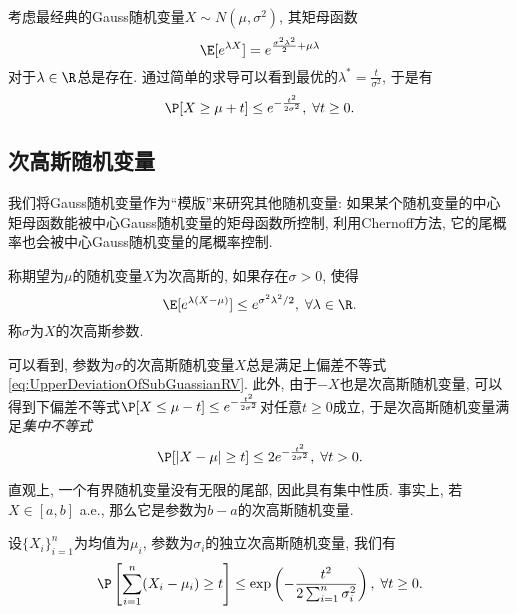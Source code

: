 \begin{example}[Gauss随机变量的上偏差不等式]
	考虑最经典的Gauss随机变量$X \sim N(\mu, \sigma^2)$, 其矩母函数
	\begin{equation}
		\E[e^{\lambda X}] = e^{\frac{\sigma^2 \lambda^2}{2} + \mu \lambda} 		
	\end{equation}
	对于$\lambda \in \R$总是存在. 
	通过简单的求导可以看到最优的$\lambda^* = \frac{t}{\sigma^2}$, 于是有
	\begin{equation}\label{eq:UpperDeviationOfSubGuassianRV}
		\P[X \geq \mu + t] \leq e^{- \frac{t^2}{2 \sigma^2}},\; \forall t \geq 0. 
	\end{equation}
\end{example}

\subsection{次高斯随机变量}

我们将Gauss随机变量作为“模版”来研究其他随机变量: 如果某个随机变量的中心矩母函数能被中心Gauss随机变量的矩母函数所控制, 利用Chernoff方法, 它的尾概率也会被中心Gauss随机变量的尾概率控制. 

\begin{definition}[次高斯随机变量]
	称期望为$\mu$的随机变量$X$为次高斯的, 如果存在$\sigma > 0$, 使得
	\begin{equation*}
		\E[e^{\lambda(X - \mu)}] \leq e^{\sigma^2 \lambda^2 /2},\; \forall \lambda \in \R. 
	\end{equation*}
	称$\sigma$为$X$的次高斯参数. 
\end{definition}
可以看到, 参数为$\sigma$的次高斯随机变量$X$总是满足上偏差不等式 \eqref{eq:UpperDeviationOfSubGuassianRV}.  
此外, 由于$-X$也是次高斯随机变量, 可以得到下偏差不等式$\P[X \leq \mu - t] \leq e^{- \frac{t^2}{2 \sigma^2}}$对任意$t \geq 0$成立, 于是次高斯随机变量满足\emph{集中不等式}
\begin{equation}\label{eq:SubGuassianConcentration}
	\P[|X - \mu| \geq t] \leq 2 e^{- \frac{t^2}{2 \sigma^2}},\; \forall t > 0. 
\end{equation}

直观上, 一个有界随机变量没有无限的尾部, 因此具有集中性质. 
事实上, 若$X \in [a,b]$ a.e., 那么它是参数为$b-a$的次高斯随机变量. 

\begin{proposition}[Hoeffding界]
	设$\{X_i\}_{i=1}^n$为均值为$\mu_i$, 参数为$\sigma_i$的独立次高斯随机变量, 我们有
	\begin{equation}
		\P \left[ \sum_{i=1}^n (X_i - \mu_i) \geq t \right]
		\leq \exp \left( - \frac{t^2}{2 \sum_{i=1}^n \sigma_i^2} \right ),\; 
		\forall t \geq 0.
	\end{equation}
\end{proposition}

